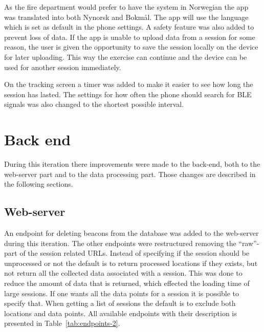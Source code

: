 \documentclass[../Main/thesis.tex]{subfiles}
\begin{document}
As the fire department would prefer to have the system in Norwegian the app was translated into both Nynorsk and Bokmål.
The app will use the language which is set as default in the phone settings.
A safety feature was also added to prevent loss of data.
If the app is unable to upload data from a session for some reason, the user is given the opportunity to save the session locally on the device for later uploading.
This way the exercise can continue and the device can be used for another session immediately. 

On the tracking screen a timer was added to make it easier to see how long the session has lasted.
The settings for how often the phone should search for BLE signals was also changed to the shortest possible interval.

\section{Back end}
During this iteration there improvements were made to the back-end, both to the web-server part and to the data processing part.
Those changes are described in the following sections.

\subsection{Web-server}
An endpoint for deleting beacons from the database was added to the web-server during this iteration.
The other endpoints were restructured removing the ``raw''-part of the session related URLs.
Instead of specifying if the session should be unprocessed or not the default is to return processed locations if they exists, but not return all the collected data associated with a session.
This was done to reduce the amount of data that is returned, which effected the loading time of large sessions.
If one wants all the data points for a session it is possible to specify that.
When getting a list of sessions the default is to exclude both locations and data points.
All available endpoints with their description is presented in Table~\ref{tab:endpoints-2}.
\end{document}
